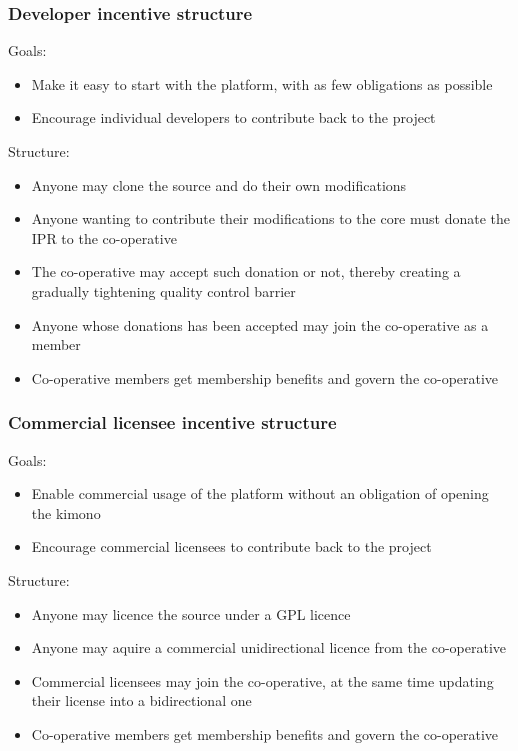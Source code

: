 \documentclass[draft,a4paper]{siamltex}
\begin{document}
\subsubsection{Developer incentive structure}

Goals:
\begin{itemize}
  \item Make it easy to start with the platform, with as few
    obligations as possible
  \item Encourage individual developers to contribute back to the
    project
\end{itemize}

Structure:
\begin{itemize}
  \item Anyone may clone the source and do their own modifications
  \item Anyone wanting to contribute their modifications to the core
    must donate the IPR to the co-operative
  \item The co-operative may accept such donation or not, thereby
    creating a gradually tightening quality control barrier
  \item Anyone whose donations has been accepted may join the
    co-operative as a member
  \item Co-operative members get membership benefits and govern the
    co-operative
\end{itemize}

\subsubsection{Commercial licensee incentive structure}

Goals:
\begin{itemize}
  \item Enable commercial usage of the platform without an obligation
    of opening the kimono
  \item Encourage commercial licensees to contribute back to the
    project
\end{itemize}

Structure:
\begin{itemize}
  \item Anyone may licence the source under a GPL licence
  \item Anyone may aquire a commercial unidirectional licence from
    the co-operative
  \item Commercial licensees may join the co-operative, at the same
    time updating their license into a bidirectional one
  \item Co-operative members get membership benefits and govern the
    co-operative
\end{itemize}
\end{document}
